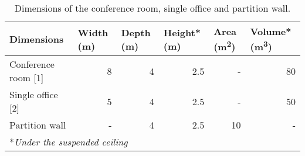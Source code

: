 \begin{table}[htbp]
	\caption{Dimensions of the conference room, single office and partition wall.}
	\label{tbl:room_dims}
	\centering
	\begin{tabular}{@{}lrrrrr@{}}
		\toprule
		Dimensions & \multicolumn{1}{l}{Width (m)} & \multicolumn{1}{l}{Depth (m)} & \multicolumn{1}{l}{Height* (m)} & \multicolumn{1}{l}{Area (m\textsuperscript{2})} & \multicolumn{1}{l}{Volume* (m\textsuperscript{3})} \\ \midrule
		Conference room [1] & 8 & 4 & 2.5 & - & 80 \\
		Single office [2] & 5 & 4 & 2.5 & - & 50 \\
		Partition wall & - & 4 & 2.5 & 10 & - \\ \bottomrule
		\multicolumn{6}{l}{*\textit{Under the suspended ceiling}}
	\end{tabular}
\end{table}